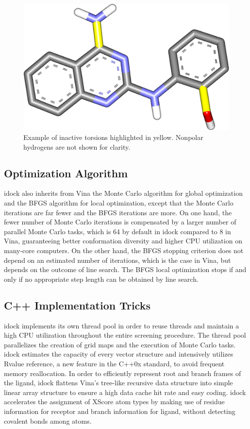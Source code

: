 \begin{figure}
\centering
\includegraphics[width=\textwidth]{VirtualScreening/Figures/ZINC00572984.png}
\caption{Example of inactive torsions highlighted in yellow. Nonpolar hydrogens are not shown for clarity.}
\label{fig:InactiveTorsions}
\end{figure}

\subsection{Optimization Algorithm}

idock also inherits from Vina the Monte Carlo algorithm for global optimization and the BFGS algorithm for local optimization, except that the Monte Carlo iterations are far fewer and the BFGS iterations are more. On one hand, the fewer number of Monte Carlo iterations is compensated by a larger number of parallel Monte Carlo tasks, which is 64 by default in idock compared to 8 in Vina, guaranteeing better conformation diversity and higher CPU utilization on many-core computers. On the other hand, the BFGS stopping criterion does not depend on an estimated number of iterations, which is the case in Vina, but depends on the outcome of line search. The BFGS local optimization stops if and only if no appropriate step length can be obtained by line search.

\subsection{C++ Implementation Tricks}

idock implements its own thread pool in order to reuse threads and maintain a high CPU utilization throughout the entire screening procedure. The thread pool parallelizes the creation of grid maps and the execution of Monte Carlo tasks. idock estimates the capacity of every vector structure and intensively utilizes Rvalue reference, a new feature in the C++0x standard, to avoid frequent memory reallocation. In order to efficiently represent root and branch frames of the ligand, idock flattens Vina's tree-like recursive data structure into simple linear array structure to ensure a high data cache hit rate and easy coding. idock accelerates the assignment of XScore atom types by making use of residue information for receptor and branch information for ligand, without detecting covalent bonds among atoms.


